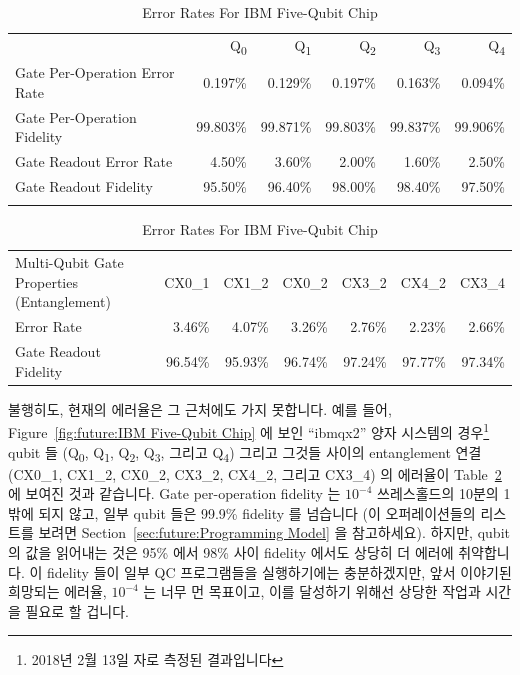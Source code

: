 \begin{table}[tbh]
\renewcommand*{\arraystretch}{1.1}
\small
\centering\OneColumnHSpace{-0.1in}
\begin{tabular}{lrrrrr}
	\toprule
	& Q\textsubscript{0} &
		Q\textsubscript{1} &
			Q\textsubscript{2} &
				Q\textsubscript{3} &
					Q\textsubscript{4} \\
	Gate Per-Operation Error Rate &
	   0.197\% &
	  	 0.129\% &
			 0.197\% &
				 0.163\% &
					 0.094\% \\
	Gate Per-Operation Fidelity &
	  99.803\% &
	  	99.871\% &
			99.803\% &
				99.837\% &
					99.906\% \\
	Gate Readout Error Rate &
	   4.50\% &
	  	 3.60\% &
			 2.00\% &
				 1.60\% &
					 2.50\% \\
	Gate Readout Fidelity &
	  95.50\% &
	  	96.40\% &
			98.00\% &
				98.40\% &
					97.50\% \\
	& & & & & \\
\end{tabular}
\begin{tabular}{lrrrrrr}
	Multi-Qubit Gate Properties (Entanglement) &
		CX0\_1 &
			CX1\_2 &
				CX0\_2 &
					CX3\_2 &
						CX4\_2 &
							CX3\_4 \\
	Error Rate &
		   3.46\% &
			 4.07\% &
				 3.26\% &
					 2.76\% &
						 2.23\% &
						 	2.66\% \\
	Gate Readout Fidelity &
	  96.54\% &
	  	95.93\% &
			96.74\% &
				97.24\% &
					97.77\% &
						97.34\% \\
	\bottomrule
\end{tabular}
\caption{Error Rates For IBM Five-Qubit Chip}
\label{tab:future:Error Rates For IBM Five-Qubit Chip}
\end{table}

불행히도, 현재의 에러율은 그 근처에도 가지 못합니다.
예를 들어,
Figure~\ref{fig:future:IBM Five-Qubit Chip} 에 보인 ``ibmqx2'' 양자 시스템의
경우\footnote{
	2018년 2월 13일 자로 측정된 결과입니다}
qubit 들
(Q\textsubscript{0}, 
Q\textsubscript{1}, 
Q\textsubscript{2}, 
Q\textsubscript{3}, 그리고
Q\textsubscript{4})
그리고 그것들 사이의 entanglement 연결
(CX0\_1,
CX1\_2,
CX0\_2,
CX3\_2,
CX4\_2, 그리고
CX3\_4)
의 에러율이
Table~\ref{tab:future:Error Rates For IBM Five-Qubit Chip} 에 보여진 것과
같습니다.
Gate per-operation fidelity 는 $10^{-4}$ 쓰레스홀드의 10분의 1밖에 되지 않고,
일부 qubit 들은 99.9\% fidelity 를 넘습니다 (이 오퍼레이션들의 리스트를 보려면
Section~\ref{sec:future:Programming Model} 을 참고하세요).
하지만, qubit 의 값을 읽어내는 것은 95\% 에서 98\% 사이 fidelity 에서도 상당히
더 에러에 취약합니다.
이 fidelity 들이 일부 QC 프로그램들을 실행하기에는 충분하겠지만, 앞서 이야기된
희망되는 에러율, $10^{-4}$ 는 너무 먼 목표이고, 이를 달성하기 위해선 상당한
작업과 시간을 필요로 할 겁니다.


